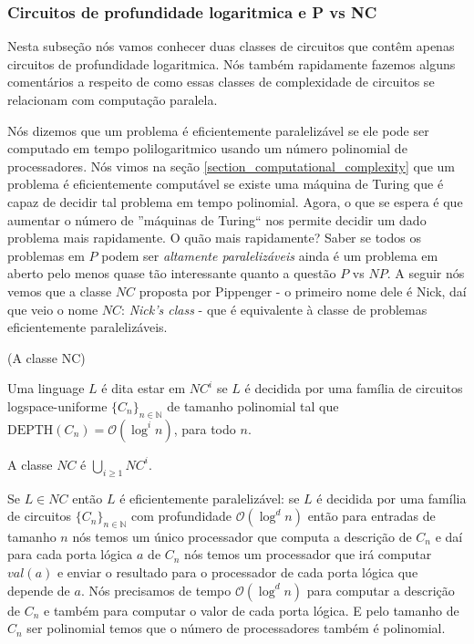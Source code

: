 \subsubsection{Circuitos de profundidade logaritmica e P vs NC}

Nesta subseção nós vamos conhecer duas classes de circuitos que contêm apenas circuitos de profundidade logaritmica. Nós também rapidamente fazemos alguns comentários a respeito de como essas classes de complexidade de circuitos se relacionam com computação paralela.

Nós dizemos que um problema é eficientemente paralelizável se ele pode ser computado em tempo polilogaritmico usando um número polinomial de processadores. Nós vimos na seção \ref{section_computational_complexity} que um problema é eficientemente computável se existe uma máquina de Turing que é capaz de decidir tal problema em tempo polinomial. Agora, o que se espera é que aumentar o número de ''máquinas de Turing`` nos permite decidir um dado problema mais rapidamente. O quão mais rapidamente? Saber se todos os problemas em $P$ podem ser \emph{altamente paralelizáveis} ainda é um problema em aberto pelo menos quase tão interessante quanto a questão $P$ vs $NP$. A seguir nós vemos que a classe $NC$ proposta por Pippenger - o primeiro nome dele é Nick, daí que veio o nome $NC$: \emph{Nick's class} - que é equivalente à classe de problemas eficientemente paralelizáveis. 


\begin{defi} (A classe NC)

Uma linguage $L$ é dita estar em $NC^{i}$ se $L$ é decidida por uma família de circuitos logspace-uniforme $\{C_{n}\}_{n \in \mathbb{N}}$ de tamanho polinomial tal que $\text{DEPTH}(C_{n}) = \mathcal{O}(\log^{i} n)$, para todo $n$.

A classe $NC$ é $\bigcup_{i \geq 1}NC^{i}$.

\end{defi}

Se $L \in NC$ então $L$ é eficientemente paralelizável: se $L$ é decidida por uma família de circuitos $\{C_{n}\}_{n \in \mathbb{N}}$ com profundidade $\mathcal{O}(\log^{d}n)$ então para entradas de tamanho $n$ nós temos um único processador que computa a descrição de $C_{n}$ e daí para cada porta lógica $a$ de $C_{n}$ nós temos um processador que irá computar $val(a)$ e enviar o resultado para o processador de cada porta lógica que depende de $a$. Nós precisamos de tempo $\mathcal{O}(\log^{d}n)$ para computar a descrição de $C_{n}$ e também para computar o valor de cada porta lógica. E pelo tamanho de $C_{n}$ ser polinomial temos que o número de processadores também é polinomial.

